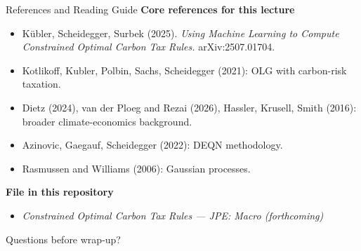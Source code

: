 \documentclass[aspectratio=169,11pt]{beamer}
\newcommand{\emphc}[1]{\textcolor{harvardcrimson}{#1}}
\begin{document}
\begin{frame}{References and Reading Guide}
\small
\textbf{Core references for this lecture}
\begin{itemize}
    \item K\"ubler, Scheidegger, Surbek (2025). \emph{Using Machine Learning to Compute Constrained Optimal Carbon Tax Rules.} arXiv:2507.01704.
    \item Kotlikoff, Kubler, Polbin, Sachs, Scheidegger (2021): OLG with carbon-risk taxation.
    \item Dietz (2024), van der Ploeg and Rezai (2026), Hassler, Krusell, Smith (2016): broader climate-economics background.
    \item Azinovic, Gaegauf, Scheidegger (2022): DEQN methodology.
    \item Rasmussen and Williams (2006): Gaussian processes.
\end{itemize}

\vspace{0.25cm}
\textbf{File in this repository}
\begin{itemize}
    \item \textit{Constrained Optimal Carbon Tax Rules — JPE: Macro (forthcoming)}
\end{itemize}

\vspace{0.3cm}
\begin{center}
{\LARGE \emphc{Questions before wrap-up?}}
\end{center}
\end{frame}
\end{document}
